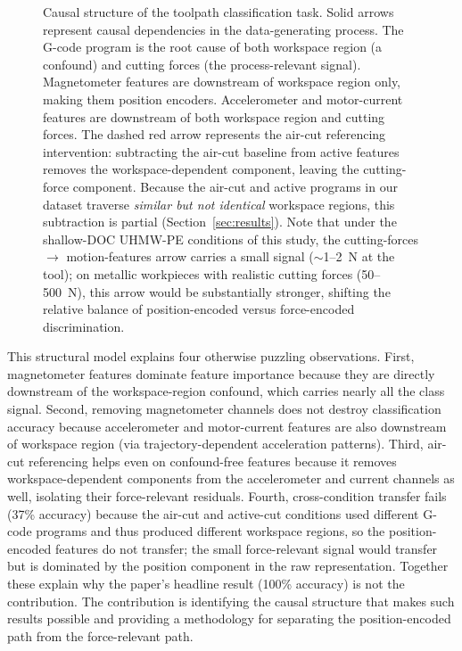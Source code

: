 \begin{figure}[H]
\caption{Causal structure of the toolpath classification task. Solid arrows represent causal dependencies in the data-generating process. The G-code program is the root cause of both workspace region (a confound) and cutting forces (the process-relevant signal). Magnetometer features are downstream of workspace region only, making them position encoders. Accelerometer and motor-current features are downstream of both workspace region and cutting forces. The dashed red arrow represents the air-cut referencing intervention: subtracting the air-cut baseline from active features removes the workspace-dependent component, leaving the cutting-force component. Because the air-cut and active programs in our dataset traverse \emph{similar but not identical} workspace regions, this subtraction is partial (Section~\ref{sec:results}). Note that under the shallow-DOC UHMW-PE conditions of this study, the cutting-forces $\rightarrow$ motion-features arrow carries a small signal ($\sim$1--2~N at the tool); on metallic workpieces with realistic cutting forces (50--500~N), this arrow would be substantially stronger, shifting the relative balance of position-encoded versus force-encoded discrimination.}
\label{fig:causal_dag}
\end{figure}

This structural model explains four otherwise puzzling observations. First, magnetometer features dominate feature importance because they are directly downstream of the workspace-region confound, which carries nearly all the class signal. Second, removing magnetometer channels does not destroy classification accuracy because accelerometer and motor-current features are also downstream of workspace region (via trajectory-dependent acceleration patterns). Third, air-cut referencing helps even on confound-free features because it removes workspace-dependent components from the accelerometer and current channels as well, isolating their force-relevant residuals. Fourth, cross-condition transfer fails (37\% accuracy) because the air-cut and active-cut conditions used different G-code programs and thus produced different workspace regions, so the position-encoded features do not transfer; the small force-relevant signal would transfer but is dominated by the position component in the raw representation. Together these explain why the paper's headline result (100\% accuracy) is not the contribution. The contribution is identifying the causal structure that makes such results possible and providing a methodology for separating the position-encoded path from the force-relevant path.

